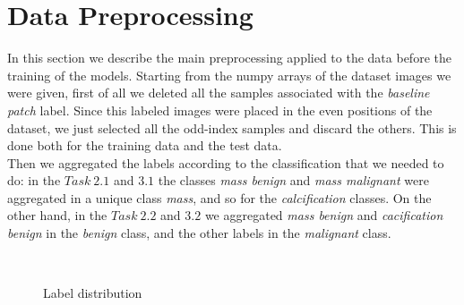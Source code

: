 \documentclass[11pt,a4paper,oneside]{article}
\begin{document}
\section{Data Preprocessing}
In this section we describe the main preprocessing applied to the data before the training of the models. Starting from the numpy arrays of the dataset images we were given, first of all we deleted all the samples associated with the \textit{baseline patch} label. Since this labeled images were placed in the even positions of the dataset, we just selected all the odd-index samples and discard the others. This is done both for the training data and the test data. \\
Then we aggregated the labels according to the classification that we needed to do: in the $Task\ 2.1$ and $3.1$ the classes \textit{mass benign} and  \textit{mass malignant} were aggregated in a unique class \textit{mass}, and so for the \textit{calcification} classes. On the other hand, in the $Task\ 2.2$ and $3.2$ we aggregated  \textit{mass benign} and  \textit{cacification benign} in the \textit{benign} class, and the other labels in the \textit{malignant} class.

\begin{figure}[h]
\centering
	 \quad
	 \\
\caption{Label distribution}
\label{fig:label distribution}
\end{figure}
\end{document}

